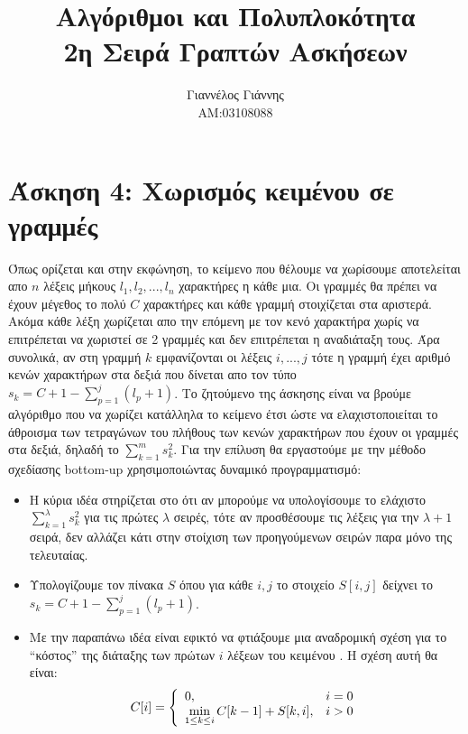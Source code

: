 \documentclass[a4paper,12pt]{report}
\title{ Αλγόριθμοι και Πολυπλοκότητα \\ 2η Σειρά Γραπτών Ασκήσεων}
\author{Γιαννέλος Γιάννης\\ΑΜ:03108088}
\begin{document}
\maketitle

\section*{Άσκηση 4: Χωρισμός κειμένου σε γραμμές}
Όπως ορίζεται και στην εκφώνηση, το κείμενο που θέλουμε να χωρίσουμε αποτελείται απο $n$ λέξεις μήκους $l_1,l_2,...,l_n$ χαρακτήρες η κάθε μια. Οι γραμμές θα πρέπει να έχουν μέγεθος το πολύ $C$ χαρακτήρες και κάθε γραμμή στοιχίζεται στα αριστερά. Ακόμα κάθε λέξη χωρίζεται απο την επόμενη με τον κενό χαρακτήρα χωρίς να επιτρέπεται να χωριστεί σε 2 γραμμές και δεν επιτρέπεται η αναδιάταξη τους. Άρα συνολικά, αν στη γραμμή $k$ εμφανίζονται οι λέξεις $i,...,j$ τότε η γραμμή έχει αριθμό κενών χαρακτήρων στα δεξιά που δίνεται απο τον τύπο $s_k=C+1-\sum_{p=1}^{j}{(l_p+1)}$. Το ζητούμενο της άσκησης είναι να βρούμε αλγόριθμο που να χωρίζει κατάλληλα το κείμενο έτσι ώστε να ελαχιστοποιείται το άθροισμα των τετραγώνων του πλήθους των κενών χαρακτήρων που έχουν οι γραμμές στα δεξιά, δηλαδή το $\sum_{k=1}^{m}{s_k^2}$. Για την επίλυση θα εργαστούμε με την μέθοδο σχεδίασης bottom-up χρησιμοποιώντας δυναμικό προγραμματισμό:

\begin{itemize}
 \item Η κύρια ιδέα στηρίζεται στο ότι αν μπορούμε να υπολογίσουμε το ελάχιστο $\sum_{k=1}^{\lambda}{s_k^2}$ για τις πρώτες $\lambda$ σειρές, τότε αν προσθέσουμε τις λέξεις για την $\lambda+1$ σειρά, δεν αλλάζει κάτι στην στοίχιση των προηγούμενων σειρών παρα μόνο της τελευταίας.
 \item Υπολογίζουμε τον πίνακα $S$ όπου για κάθε $i,j$ το στοιχείο $S[i,j]$ δείχνει το $s_k=C+1-\sum_{p=1}^{j}{(l_p+1)}$.
 \item Με την παραπάνω ιδέα είναι εφικτό να φτιάξουμε μια αναδρομική σχέση για το ``κόστος'' της διάταξης των πρώτων $i$ λέξεων του κειμένου . Η σχέση αυτή θα είναι:
  $$
   C[i]=\left\{\begin{array}{l l}
           0, & i=0 \\
	  \displaystyle \min_{1 \leq k \leq i}C[k-1]+S[k,i], & i>0
          \end{array} \right.
  $$ 


\end{itemize}
\end{document}

